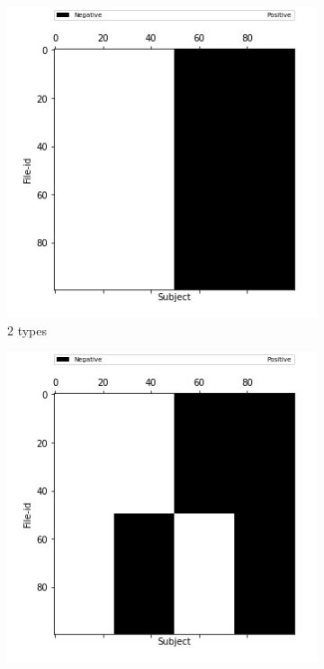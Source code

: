 \documentclass[10pt, conference, compsocconf]{IEEEtran}
\begin{document}
\begin{figure}
\centering
        \begin{subfigure}[b]{0.4\linewidth}
                  \includegraphics[width=\columnwidth]{data/Utility_Matrix/Synthetic/synthetic_subject_types/2_SubjectType_utility_matrix.png}
                  \caption{2 types}
        \end{subfigure}
        \begin{subfigure}[b]{0.4\linewidth}
                  \includegraphics[width=\columnwidth]{data/Utility_Matrix/Synthetic/synthetic_subject_types/4_SubjectType_utility_matrix.png}

\end{subfigure}
\end{figure}
\end{document}
